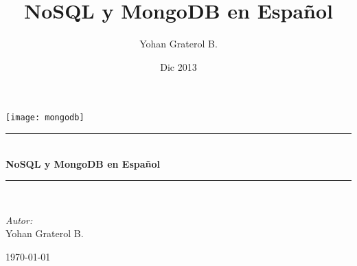 \documentclass[a4paper, pdftex, 14pt, oneside, titlepage, openany, onecolumn]{book}
\newcommand{\HRule}{\rule{\linewidth}{0.5mm}}
\begin{document}
 
\pagestyle{fancy}
\renewcommand\headrulewidth{0pt}
\setlength{\parskip}{16pt}
\onehalfspace
\lhead{}

\author{Yohan Graterol B.}
\title{NoSQL y MongoDB en Español}
\date{Dic 2013}

\begin{titlepage}
	\begin{center}
		\texttt{[image: mongodb]}
		\HRule \\[0.4cm]
		{ \huge \bfseries NoSQL y MongoDB en Español \\[0.4cm] }

		\HRule \\[1.5cm]
		
		\begin{minipage}{0.4\textwidth}
			\begin{flushleft} \large
				\emph{Autor:}\\
				Yohan {Graterol B.}
			\end{flushleft}
		\end{minipage}
	    \begin{minipage}{0.4\textwidth}
			\begin{flushright} \large
			\end{flushright}
		\end{minipage}

		\vfill

		{\large \today}
	\end{center}
\end{titlepage}

\newpage
\mbox{}
\thispagestyle{empty} 



\tableofcontents









\backmatter
 

\printindex
\end{document}
